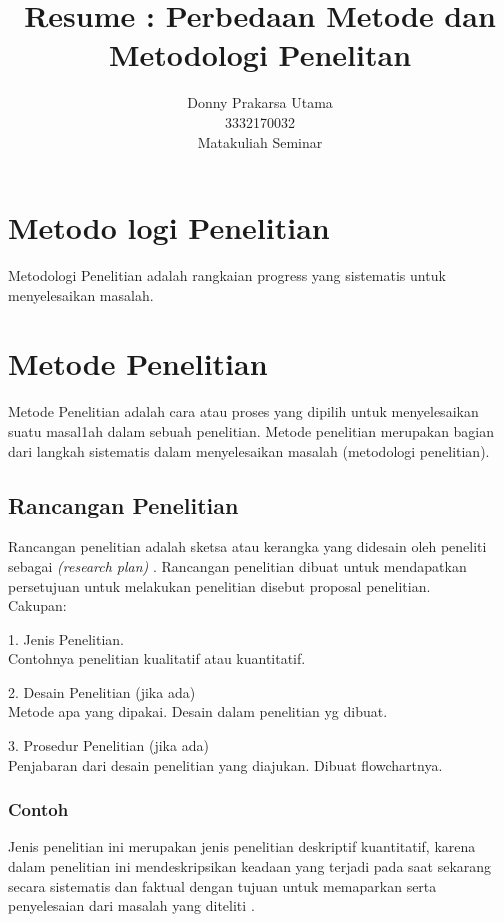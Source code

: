 \documentclass[10pt]{IEEEtran}
\begin{document}
\title{Resume : Perbedaan Metode dan Metodologi Penelitan}
\author{Donny Prakarsa Utama\\3332170032\\ Matakuliah Seminar}
\maketitle

\section{Metodo logi Penelitian}
Metodologi Penelitian adalah rangkaian progress yang sistematis untuk menyelesaikan masalah\cite{youtube:1}.
\section{Metode Penelitian}
Metode Penelitian adalah cara atau proses yang dipilih untuk menyelesaikan suatu masal1ah dalam sebuah penelitian. Metode penelitian merupakan bagian dari langkah sistematis dalam menyelesaikan masalah (metodologi penelitian)\cite{youtube:1}.
\subsection{Rancangan Penelitian} Rancangan penelitian adalah sketsa atau kerangka yang didesain oleh peneliti sebagai
\textit{(research plan)}  . Rancangan penelitian dibuat untuk mendapatkan persetujuan untuk melakukan penelitian disebut proposal penelitian\cite{youtube:1}.\\
Cakupan:

1. Jenis Penelitian. \\ Contohnya penelitian kualitatif atau kuantitatif.

2. Desain Penelitian (jika ada) \\
Metode apa yang dipakai. Desain dalam penelitian yg dibuat.

3. Prosedur Penelitian (jika ada) \\
Penjabaran dari desain penelitian yang diajukan. Dibuat flowchartnya.


\subsubsection*{Contoh}
Jenis penelitian ini merupakan jenis penelitian deskriptif kuantitatif, karena dalam penelitian ini mendeskripsikan keadaan yang terjadi pada saat sekarang
secara sistematis dan faktual dengan tujuan untuk memaparkan serta penyelesaian dari masalah yang diteliti \cite{unila:2}.
\end{document}
